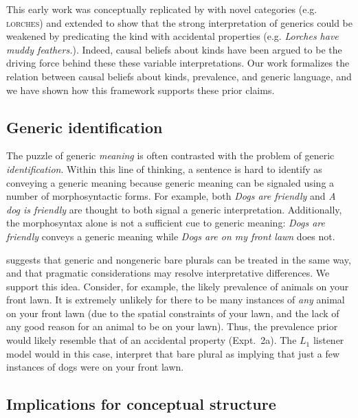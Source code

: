 \documentclass[12pt,letterpaper]{article}
\begin{document}
This early work was conceptually replicated by  with novel categories (e.g. \textsc{lorches}) and extended to show that the strong interpretation of generics could be weakened by predicating the kind with accidental properties (e.g. \emph{Lorches have muddy feathers.}).
Indeed, causal beliefs about kinds have been argued to be the driving force behind these these variable interpretations\cite{Gelman2007, Cimpian2010c}.
Our work formalizes the relation between causal beliefs about kinds, prevalence, and generic language, and we have shown how this framework supports these prior claims.


\subsection*{Generic identification}

The puzzle of generic \emph{meaning} is often contrasted with the problem of generic \emph{identification}. 
Within this line of thinking, a sentence is hard to identify as conveying a generic meaning because generic meaning can be signaled using a number of morphosyntactic forms. 
For example, both \emph{Dogs are friendly} and \emph{A dog is friendly} are thought to both signal a generic interpretation.
Additionally, the morphosyntax alone is not a sufficient cue to generic meaning: \emph{Dogs are friendly} conveys a generic meaning while \emph{Dogs are on my front lawn} does not.

 suggests that generic and nongeneric bare plurals can be treated in the same way, and that pragmatic considerations may resolve interpretative differences. 
We support this idea.
Consider, for example, the likely prevalence of animals on your front lawn. 
It is extremely unlikely for there to be many instances of \emph{any} animal on your front lawn (due to the spatial constraints of your lawn, and the lack of any good reason for an animal to be on your lawn). 
Thus, the prevalence prior would likely resemble that of an accidental property (Expt.~2a).
The $L_1$ listener model would in this case, interpret that bare plural as implying that just a few instances of dogs were on your front lawn. 


\subsection*{Implications for conceptual structure}
\end{document}
